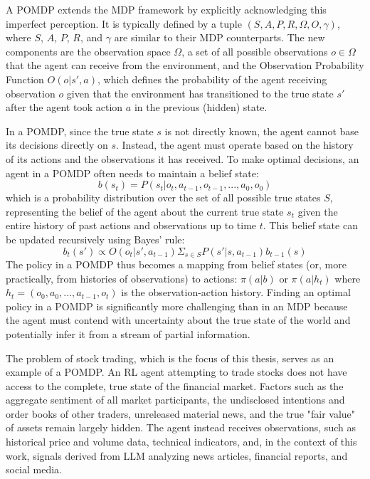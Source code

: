 A \gls{POMDP} extends the \gls{MDP} framework by explicitly acknowledging this imperfect perception. It is typically defined by a tuple \((S, A, P, R, \Omega, O, \gamma)\), where \(S\), \(A\), \(P\), \(R\), and \(\gamma\) are similar to their \gls{MDP} counterparts. The new components are the observation space \(\Omega\), a set of all possible observations \(o \in \Omega\) that the agent can receive from the environment, and the Observation Probability Function \(O(o | s', a)\), which defines the probability of the agent receiving observation \(o\) given that the environment has transitioned to the true state \(s'\) after the agent took action \(a\) in the previous (hidden) state.

In a \gls{POMDP}, since the true state \(s\) is not directly known, the agent cannot base its decisions directly on \(s\). Instead, the agent must operate based on the history of its actions and the observations it has received. To make optimal decisions, an agent in a POMDP often needs to maintain a belief state: 
\[b(s_t) = P(s_t | o_t, a_{t-1}, o_{t-1}, ..., a_0, o_0)\] 
which is a probability distribution over the set of all possible true states \(S\), representing the belief of the agent about the current true state \(s_t\) given the entire history of past actions and observations up to time \(t\). This belief state can be updated recursively using Bayes' rule: 
\[b_t(s') \propto  O(o_t | s', a_{t-1}) \Sigma_{s \in S} P(s' | s, a_{t-1}) b_{t-1}(s)\] 
The policy in a \gls{POMDP} thus becomes a mapping from belief states (or, more practically, from histories of observations) to actions: \(\pi(a | b)\) or \(\pi(a | h_t)\) where \(h_t = (o_0, a_0, ..., a_{t-1}, o_t)\) is the observation-action history. Finding an optimal policy in a \gls{POMDP} is significantly more challenging than in an \gls{MDP} because the agent must contend with uncertainty about the true state of the world and potentially infer it from a stream of partial information.

The problem of stock trading, which is the focus of this thesis, serves as an example of a \gls{POMDP}. An \gls{RL} agent attempting to trade stocks does not have access to the complete, true state of the financial market. Factors such as the aggregate sentiment of all market participants, the undisclosed intentions and order books of other traders, unreleased material news, and the true "fair value" of assets remain largely hidden. The agent instead receives observations, such as historical price and volume data, technical indicators, and, in the context of this work, signals derived from \gls{LLM} analyzing news articles, financial reports, and social media. 

